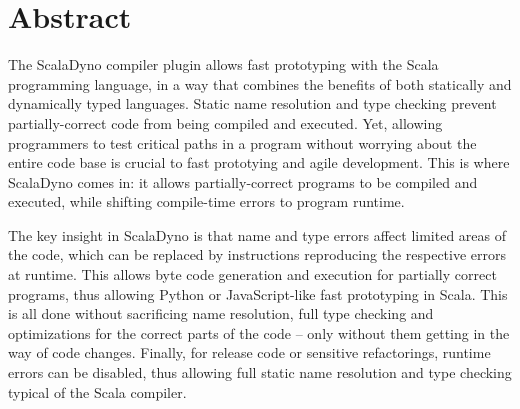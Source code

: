 \section{Abstract}





The ScalaDyno compiler plugin allows fast prototyping with the Scala programming language, in a way that combines the benefits of both statically and dynamically typed languages. Static name resolution and type checking prevent partially-correct code from being compiled and executed. Yet, allowing programmers to test critical paths in a program without worrying about the entire code base is crucial to fast prototying and agile development. This is where ScalaDyno comes in: it allows partially-correct programs to be compiled and executed, while shifting compile-time errors to program runtime.

The key insight in ScalaDyno is that name and type errors affect limited areas of the code, which can be replaced by instructions reproducing the respective errors at runtime. This allows byte code generation and execution for partially correct programs, thus allowing Python or JavaScript-like fast prototyping in Scala. This is all done without sacrificing name resolution, full type checking and optimizations for the correct parts of the code -- only without them getting in the way of code changes. Finally, for release code or sensitive refactorings, runtime errors can be disabled, thus allowing full static name resolution and type checking typical of the Scala compiler.


